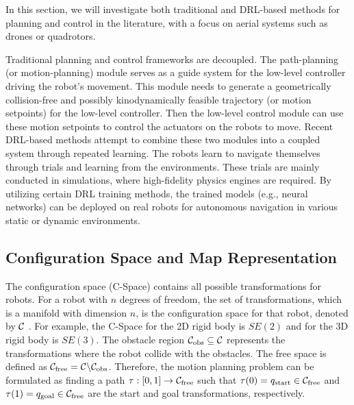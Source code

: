 \documentclass[letterpaper,journal,twoside]{IEEEtran}
\begin{document}
In this section, we will investigate both traditional 
and DRL-based methods for planning and control in the 
literature, with a focus on aerial systems 
such as drones or quadrotors.

Traditional planning and control frameworks are decoupled.
The path-planning (or motion-planning) module serves as a guide system 
for the low-level controller driving the robot's movement. 
This module needs to generate a geometrically 
collision-free and possibly kinodynamically feasible trajectory 
(or motion setpoints) for the low-level controller.
Then the low-level control module can use these motion 
setpoints to control the actuators on the robots to move.
Recent DRL-based methods attempt to combine these two modules 
into a coupled system through repeated learning. 
The robots learn to navigate themselves through trials and learning 
from the environments.
These trials are mainly conducted in simulations, 
where high-fidelity physics engines are required. 
By utilizing certain DRL training methods, 
the trained models (e.g., neural networks) can be deployed 
on real robots for autonomous navigation in various static 
or dynamic environments.

\subsection{Configuration Space and Map Representation}
The configuration space (C-Space) contains all possible transformations
for robots. 
For a robot with $n$ degrees of freedom, the set of 
transformations, which is a manifold with dimension $n$, is 
the configuration space for that robot, denoted by $\mathcal{C}$
\cite{quan2020survey}. 
For example, the C-Space for the 2D rigid body is $SE(2)$ 
and for the 3D rigid body is $SE(3)$.
The obstacle region $\mathcal{C}_{\text{obs}} \subseteq \mathcal{C}$ 
represents the transformations where the robot collide with the obstacles. 
The free space is defined as $\mathcal{C}_{\text{free}} = 
\mathcal{C} \backslash \mathcal{C}_{\text{obs}}$.
Therefore, the motion planning problem can be formulated as 
finding a path 
$
  \tau : \left[0,1\right]\rightarrow \mathcal{C}_{\text{free}}
$
such that $\tau(0) = q_{\text{start}} 
\in \mathcal{C}_{\text{free}}$ and 
$\tau(1) = q_{\text{goal}} \in \mathcal{C}_{\text{free}}$
are the start and goal transformations, respectively.
\end{document}
